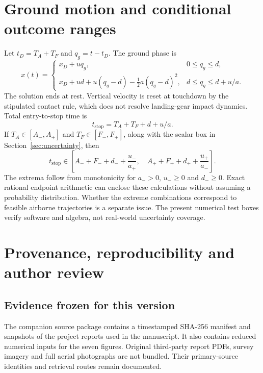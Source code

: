 \section{Ground motion and conditional outcome ranges}
\label{app:ground}
Let $t_D=T_A+T_F$ and $q_g=t-t_D$. The ground phase is
\begin{equation}
x(t)=\begin{cases}
x_D+uq_g,&0\leq q_g\leq d,\\
x_D+ud+u(q_g-d)-\tfrac12 a(q_g-d)^2,&d\leq q_g\leq d+u/a.
\end{cases}
\end{equation}
The solution ends at rest. Vertical velocity is reset at touchdown by the stipulated contact rule, which does not resolve landing-gear impact dynamics. Total entry-to-stop time is
\begin{equation}
t_{\mathrm{stop}}=T_A+T_F+d+u/a.
\end{equation}
If $T_A\in[A_-,A_+]$ and $T_F\in[F_-,F_+]$, along with the scalar box in Section~\ref{sec:uncertainty}, then
\begin{equation}
t_{\mathrm{stop}}\in
\left[A_-+F_-+d_-+\frac{u_-}{a_+},\quad
A_++F_++d_++\frac{u_+}{a_-}\right].
\end{equation}
The extrema follow from monotonicity for $a_->0$, $u_-\geq0$ and $d_-\geq0$. Exact rational endpoint arithmetic can enclose these calculations without assuming a probability distribution. Whether the extreme combinations correspond to feasible airborne trajectories is a separate issue. The present numerical test boxes verify software and algebra, not real-world uncertainty coverage.

\section{Provenance, reproducibility and author review}
\label{app:provenance}
\subsection{Evidence frozen for this version}
The companion source package contains a timestamped SHA-256 manifest and snapshots of the project reports used in the manuscript. It also contains reduced numerical inputs for the seven figures. Original third-party report PDFs, survey imagery and full aerial photographs are not bundled. Their primary-source identities and retrieval routes remain documented.

